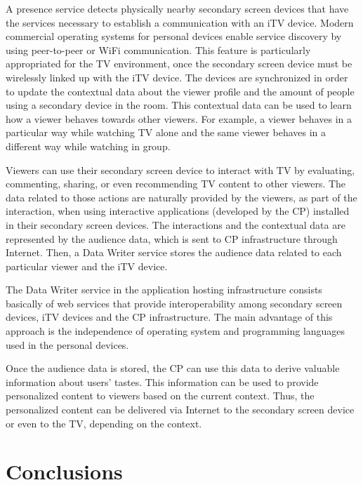 \documentclass[journal]{IEEEtran}
\begin{document}
A presence service detects physically nearby secondary screen devices that have the services necessary to establish a communication with an iTV device. Modern commercial operating systems for personal devices enable service discovery by using peer-to-peer or WiFi communication. This feature is particularly appropriated for the TV environment, once the secondary screen device must be wirelessly linked up with the iTV device. The devices are synchronized in order to update the contextual data about the viewer profile and the amount of people using a secondary device in the room. This contextual data can be used to learn how a viewer behaves towards other viewers. For example, a viewer behaves in a particular way while watching TV alone and the same viewer behaves in a different way while watching in group.

Viewers can use their secondary screen device to interact with TV by evaluating, commenting, sharing, or even recommending TV content to other viewers. The data related to those actions are naturally provided by the viewers, as part of the interaction, when using interactive applications (developed by the CP) installed in their secondary screen devices. The interactions and the contextual data are represented by the audience data, which is sent to CP infrastructure through Internet. Then, a Data Writer service stores the audience data related to each particular viewer and the iTV device.

The Data Writer service in the application hosting infrastructure consists basically of web services that provide interoperability among secondary screen devices, iTV devices and the CP infrastructure. The main advantage of this approach is the independence of operating system and programming languages used in the personal devices.

Once the audience data is stored, the CP can use this data to derive valuable information about users' tastes. This information can be used to provide personalized content to viewers based on the current context. Thus, the personalized content can be delivered via Internet to the secondary screen device or even to the TV, depending on the context.

\section{Conclusions}
\end{document}
